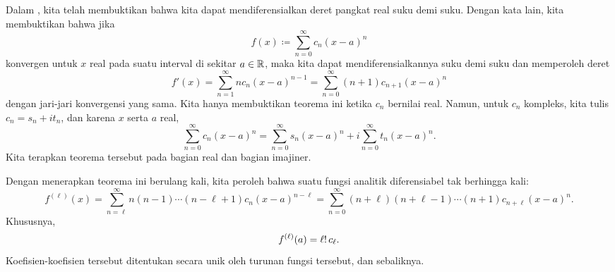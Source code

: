 Dalam , kita telah membuktikan bahwa kita dapat
mendiferensialkan deret pangkat real suku demi suku.  Dengan kata lain,
kita membuktikan bahwa jika
\begin{equation*}
f(x) \coloneqq \sum_{n=0}^\infty c_n {(x-a)}^n
\end{equation*}
konvergen untuk $x$ real pada suatu interval di sekitar $a \in {\mathbb{R}}$, maka kita dapat mendiferensialkannya
suku demi suku dan memperoleh deret
\begin{equation*}
f'(x) =
\sum_{n=1}^\infty n c_n {(x-a)}^{n-1}
=
\sum_{n=0}^\infty (n+1)c_{n+1} {(x-a)}^{n} 
\end{equation*}
dengan jari-jari konvergensi yang sama.
Kita hanya membuktikan teorema ini ketika $c_n$ bernilai real.
Namun, untuk $c_n$ kompleks,
kita tulis
$c_n = s_n + i t_n$, dan karena $x$ serta $a$ real,
\begin{equation*}
\sum_{n=0}^\infty c_n {(x-a)}^n
=
\sum_{n=0}^\infty s_n {(x-a)}^n
+
i
\sum_{n=0}^\infty t_n {(x-a)}^n .
\end{equation*}
Kita terapkan teorema tersebut pada bagian real dan
bagian imajiner.

Dengan menerapkan teorema ini berulang kali, kita peroleh bahwa suatu
fungsi analitik diferensiabel tak berhingga kali:
\begin{equation*}
f^{(\ell)}(x)
=
\sum_{n=\ell}^\infty n(n-1)\cdots(n-\ell+1)c_n {(x-a)}^{n-\ell}
=
\sum_{n=0}^\infty (n+\ell)(n+\ell-1)\cdots (n+1) c_{n+\ell} {(x-a)}^{n} .
\end{equation*}
Khususnya,
\begin{equation} \label{eq:formulaforpscoeffs}
f^{(\ell)}(a) = \ell! \, c_\ell .
\avoidbreak
\end{equation}
Koefisien-koefisien tersebut ditentukan secara unik oleh turunan
fungsi tersebut, dan sebaliknya.

